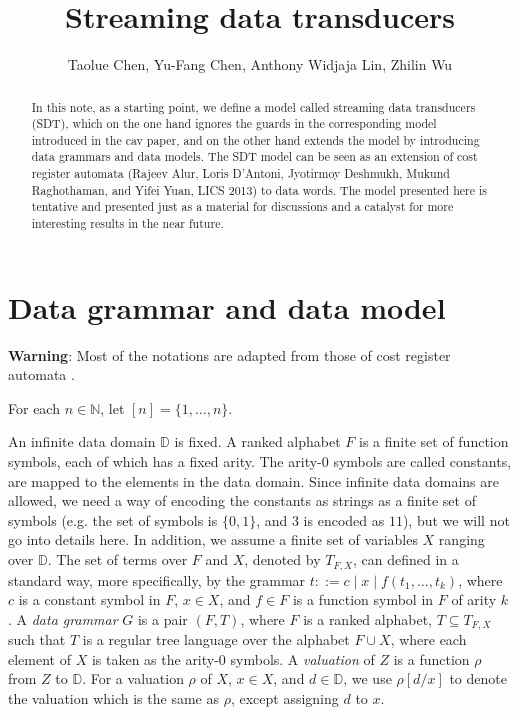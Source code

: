 \documentclass[runningheads,a4paper]{llncs}
\title{Streaming data transducers}
\author{}
\institute{}
\author{Taolue Chen, Yu-Fang Chen, Anthony Widjaja Lin, Zhilin Wu}
\newcommand\dd{\mathbb{D}}
\newcommand\nat{\mathbb{N}}
\begin{document}
\maketitle


\begin{abstract}
In this note, as a starting point, we define a model called streaming data transducers (SDT), which on the one hand ignores the guards in the corresponding model introduced in the cav paper, and on the other hand extends the model by introducing data grammars and data models. The SDT model can be seen as an extension of cost register automata (Rajeev Alur, Loris D'Antoni, Jyotirmoy Deshmukh, Mukund Raghothaman,  and Yifei Yuan, LICS 2013) to data words. The model presented here is tentative and presented just as a material for discussions and a catalyst for more interesting results in the near future.
\end{abstract}



\section{Data grammar and data model}

{\bf Warning}: Most of the notations are adapted from those of cost register automata \cite{ADD+13}.

For each $n \in \nat$, let $[n]=\{1,\dots, n\}$.

An infinite data domain $\dd$ is fixed.
A ranked alphabet $F$ is a finite set of function symbols, each of which has a fixed arity. The arity-0 symbols are called constants, are mapped to the elements in the data domain. Since infinite data domains are allowed, we need a way of encoding the constants as strings as a finite set of symbols (e.g. the set of symbols is $\{0,1\}$, and $3$ is encoded as $11$), but we will not go into details here. In addition, we assume a  finite set of variables $X$ ranging over $\dd$.  The set of terms over $F$ and $X$, denoted by $T_{F, X}$, can defined in a standard way, more specifically, by the grammar $t::= c \mid x  \mid f(t_1,\dots, t_k)$, where $c$ is a constant symbol in $F$, $x \in X$, and $f \in F$ is a function symbol in $F$ of arity $k$. A \emph{data grammar} $G$ is a pair $(F, T)$, where $F$ is a ranked alphabet, $T \subseteq T_{F,X}$ such that $T$ is a regular tree language over the alphabet $F \cup X$, where each element of $X$ is taken as the arity-0 symbols.  A \emph{valuation} of $Z$ is a function $\rho$ from $Z$ to $\dd$. For a valuation $\rho$ of $X$, $x \in X$, and $d \in \dd$, we use $\rho[d/x]$ to denote the valuation which is the same as $\rho$, except assigning $d$ to $x$.
\end{document}
